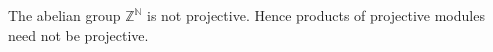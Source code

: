 The abelian group $\mathbb{Z}^{\mathbb{N}}$ is not projective. Hence products of projective modules need not be projective.
